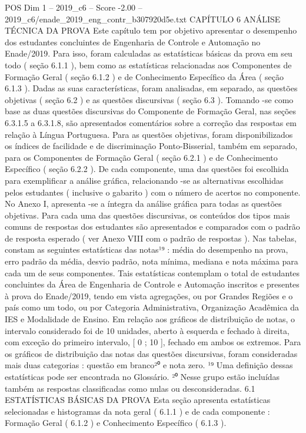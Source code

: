 \begin{textsample}{POS Dim 1 – 2019\_c6 – Score -2.00 – 2019\_c6/enade\_2019\_eng\_contr\_b307920d5e.txt}  \label{ex:f1_pos_351}
CAPÍTULO 6 ANÁLISE TÉCNICA DA PROVA Este capítulo tem por objetivo apresentar o desempenho dos estudantes concluintes de Engenharia de Controle e Automação no Enade/2019.
Para isso, foram calculadas as estatísticas básicas da prova em seu todo ( seção 6.1.1 ), bem como as estatísticas relacionadas aos Componentes de Formação Geral ( seção 6.1.2 ) e de Conhecimento Específico da Área ( seção 6.1.3 ).
Dadas as suas características, foram analisadas, em separado, as questões objetivas ( seção 6.2 ) e as questões discursivas ( seção 6.3 ).
Tomando -se como base as duas questões discursivas do Componente de Formação Geral, nas seções 6.3.1.5 a 6.3.1.8, são apresentados comentários sobre a correção das respostas em relação à Língua Portuguesa.
Para as questões objetivas, foram disponibilizados os índices de facilidade e de discriminação Ponto-Bisserial, também em separado, para os Componentes de Formação Geral ( seção 6.2.1 ) e de Conhecimento Específico ( seção 6.2.2 ).
De cada componente, uma das questões foi escolhida para exemplificar a análise gráfica, relacionando -se as alternativas escolhidas pelos estudantes ( inclusive o gabarito ) com o número de acertos no componente.
No Anexo I, apresenta -se a íntegra da análise gráfica para todas as questões objetivas.
Para cada uma das questões discursivas, os conteúdos dos tipos mais comuns de respostas dos estudantes são apresentados e comparados com o padrão de resposta esperado ( ver Anexo VIII com o padrão de respostas ).
Nas tabelas, constam as seguintes estatísticas das notas¹⁹ : média do desempenho na prova, erro padrão da média, desvio padrão, nota mínima, mediana e nota máxima para cada um de seus componentes.
Tais estatísticas contemplam o total de estudantes concluintes da Área de Engenharia de Controle e Automação inscritos e presentes à prova do Enade/2019, tendo em vista agregações, ou por Grandes Regiões e o país como um todo, ou por Categoria Administrativa, Organização Acadêmica da IES e Modalidade de Ensino.
Em relação aos gráficos de distribuição de notas, o intervalo considerado foi de 10 unidades, aberto à esquerda e fechado à direita, com exceção do primeiro intervalo, [ 0 ; 10 ], fechado em ambos os extremos.
Para os gráficos de distribuição das notas das questões discursivas, foram consideradas mais duas categorias : questão em branco²⁰ e nota zero. ¹⁹ Uma definição dessas estatísticas pode ser encontrada no Glossário. ²⁰ Nesse grupo estão incluídas também as respostas classificadas como nulas ou desconsideradas. 6.1 ESTATÍSTICAS BÁSICAS DA PROVA Esta seção apresenta estatísticas selecionadas e histogramas da nota geral ( 6.1.1 ) e de cada componente : Formação Geral ( 6.1.2 ) e Conhecimento Específico ( 6.1.3 ).

\end{textsample}
